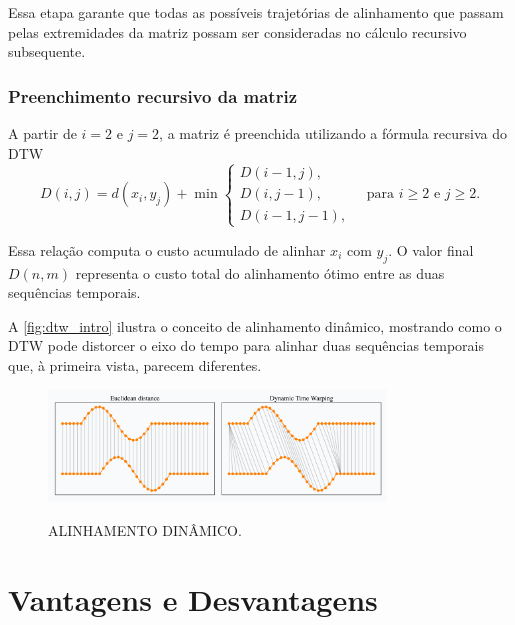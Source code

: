 Essa etapa garante que todas as possíveis trajetórias de alinhamento que passam pelas extremidades da matriz possam ser consideradas no cálculo recursivo subsequente.

\subsubsection*{Preenchimento recursivo da matriz}

A partir de \(i = 2\) e \(j = 2\), a matriz é preenchida utilizando a fórmula recursiva do DTW
\begin{equation}
    D(i, j) = d(x_i, y_j) + \min \begin{cases}
        D(i-1, j), \\
        D(i, j-1), \\
        D(i-1, j-1),
    \end{cases}
    \quad \text{para } i \geq 2 \text{ e } j \geq 2.
\end{equation}

Essa relação computa o custo acumulado de alinhar \(x_i\) com \(y_j\). O valor final \(D(n, m)\) representa o custo total do alinhamento ótimo entre as duas sequências temporais.


A \autoref{fig:dtw_intro} ilustra o conceito de alinhamento dinâmico, mostrando como o DTW pode distorcer o eixo do tempo para alinhar duas sequências temporais que, à primeira vista, parecem diferentes.

\begin{figure}[h!]
    \centering
    \caption{ALINHAMENTO DINÂMICO.}
    \includegraphics[width=0.8\textwidth]{fig/dtw_vs_euc.png}
    \label{fig:dtw_intro}
\end{figure}

\section{Vantagens e Desvantagens}

